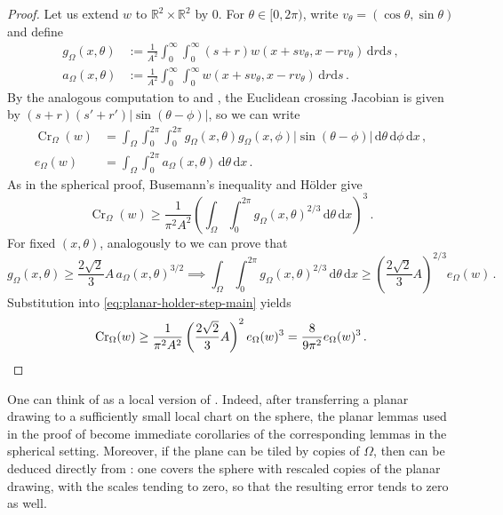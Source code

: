 \documentclass[reqno, 11pt]{amsart}
\theoremstyle{definition}
\newcommand{\abs}[1]{\left\lvert#1\right\rvert}
\newcommand{\dd}{\mathrm{d}}
\begin{document}
\begin{proof}
Let us extend $w$ to ${\mathbb R}^2 \times {\mathbb R}^2$ by $0$. For \(\theta\in[0,2\pi)\), write \(v_\theta=(\cos\theta,\sin\theta)\) and define
\begin{align*}
        g_\Omega(x,\theta)
        &:=\frac{1}{A^2}\int_{0}^\infty\int_{0}^\infty
        (s+r)w(x+sv_\theta,x-rv_\theta)\,\dd r\dd s\,,\\
        a_\Omega(x,\theta)
        &:=\frac{1}{A^2}\int_{0}^\infty\int_{0}^\infty
        w(x+sv_\theta,x-rv_\theta)\,\dd r\dd s\,.
\end{align*}
By the analogous computation to  and , the Euclidean crossing  Jacobian is given by
\((s+r)(s'+r')\abs{\sin(\theta-\phi)}\), so we can write 
\[
\begin{aligned}
        \operatorname{Cr}_\Omega(w)
        &=\int_\Omega\int_0^{2\pi}\int_0^{2\pi}
        g_\Omega(x,\theta)g_\Omega(x,\phi)\abs{\sin(\theta-\phi)}
        \,\dd\theta \, \dd\phi \, \dd x\,,\\
        e_\Omega(w)
        &=\int_\Omega\int_0^{2\pi}a_\Omega(x,\theta)\,\dd\theta \, \dd x\,.
\end{aligned}
\]
As in the spherical proof, Busemann's inequality and H\"older give
\begin{equation}\label{eq:planar-holder-step-main}
        \operatorname{Cr}_\Omega(w)
        \ge
        \frac1{\pi^2A^2}
        \left(\int_\Omega\int_0^{2\pi}g_\Omega(x,\theta)^{2/3}\,\dd\theta \, \dd x\right)^3\,.
\end{equation}
For fixed \((x,\theta)\), analogously to  we can prove that 
\begin{equation*}
    g_\Omega(x,\theta) \geq \frac{2\sqrt{2} }{3} A  \, a_\Omega(x,\theta)^{3/2} \implies  \int_\Omega\int_0^{2\pi}g_\Omega(x,\theta)^{2/3}\,\dd\theta\, \dd x
        \ge
        \left(\frac{2\sqrt2}{3} A\right)^{2/3}e_\Omega(w)\,.
\end{equation*}
Substitution into \eqref{eq:planar-holder-step-main} yields
\[
        \operatorname{Cr}_\Omega(w)
        \ge
        \frac1{\pi^2A^2}
        \left(\frac{2\sqrt2}{3} A\right)^2e_\Omega(w)^3
        =
        \frac8{9\pi^2} e_\Omega(w)^3\,. \qedhere \]
\end{proof}
One can think of  as a local version of . Indeed, after transferring a planar drawing to a sufficiently small local chart on the sphere, the planar lemmas used in the proof of  become immediate corollaries of the corresponding lemmas in the spherical setting. Moreover, if the plane can be tiled by copies of $\Omega$, then  can be deduced directly from : one covers the sphere with rescaled copies of the planar drawing, with the scales tending to zero, so that the resulting error tends to zero as well. 
\end{document}
